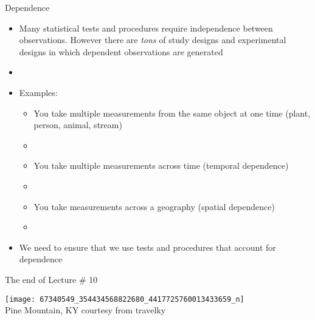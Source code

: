 \documentclass[xcolor=dvipsnames]{beamer}
\begin{document}
\begin{frame}{Dependence}
	\begin{itemize}
		\item Many statistical tests and procedures require independence between observations. However there are \emph{tons} of study designs and experimental designs in which dependent observations are generated \pause
		\item[]
		\item Examples: \pause
		\begin{itemize}
			\item You take multiple measurements from the same object at one time (plant, person, animal, stream) \pause
			\item[]
			\item You take multiple measurements across time (temporal dependence) \pause
			\item[]
			\item You take measurements across a geography (spatial dependence) \pause
			\item[]
		\end{itemize}
	\item We need to ensure that we use tests and procedures that account for dependence
	\end{itemize}
\end{frame}

\begin{frame}{The end of Lecture \# 10}
	\begin{center}
		\texttt{[image: 67340549\_354434568822680\_4417725760013433659\_n]} \\
		
		{\tiny Pine Mountain, KY courtesy from travelky}
	\end{center}
\end{frame}
\end{document}
